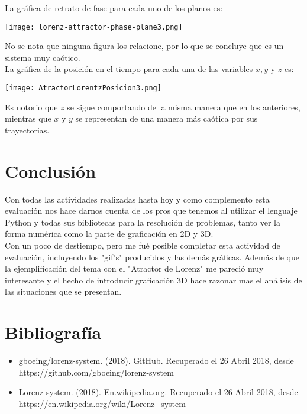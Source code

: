 \documentclass[12pt]{article}
\begin{document}
La gráfica de retrato de fase para cada uno de los planos es:
\begin{center}
    \texttt{[image: lorenz-attractor-phase-plane3.png]}\\
\end{center}
No se nota que ninguna figura los relacione, por lo que se concluye que es un sistema muy caótico.\\

La gráfica de la posición en el tiempo para cada una de las variables $x, y$ y $z$ es:
\begin{center}
    \texttt{[image: AtractorLorentzPosicion3.png]}\\
\end{center}
Es notorio que $z$ se sigue comportando de la misma manera que en los anteriores, mientras que $x$ y $y$ se representan de una manera más caótica por sus trayectorias.

\section*{Conclusión}
Con todas las actividades realizadas hasta hoy y como complemento esta evaluación nos hace darnos cuenta de los pros que tenemos al utilizar el lenguaje Python y todas sus bibliotecas para la resolución de problemas, tanto ver la forma numérica como la parte de graficación en 2D y 3D.\\

Con un poco de destiempo, pero me fué posible completar esta actividad de evaluación, incluyendo los "gif's" producidos y las demás gráficas. Además de que la ejemplificación del tema con el "Atractor de Lorenz" me pareció muy interesante y el hecho de introducir graficación 3D hace razonar mas el análisis de las situaciones que se presentan.

\section*{Bibliografía}
\begin{itemize}
\item gboeing/lorenz-system. (2018). GitHub. Recuperado el 26 Abril 2018, desde\\ https://github.com/gboeing/lorenz-system 
\item Lorenz system. (2018). En.wikipedia.org. Recuperado el 26 Abril 2018, desde https://en.wikipedia.org/wiki/Lorenz\_system
\end{itemize}
\end{document}
